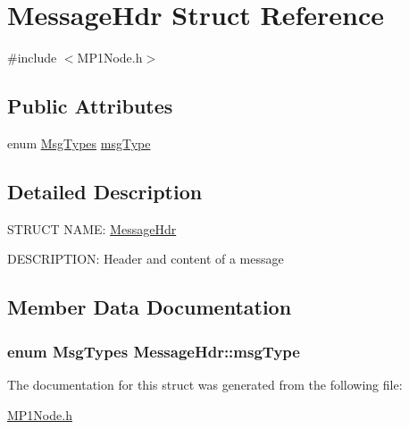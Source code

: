 \hypertarget{struct_message_hdr}{}\section{Message\+Hdr Struct Reference}
\label{struct_message_hdr}


{\ttfamily \#include $<$M\+P1\+Node.\+h$>$}

\subsection*{Public Attributes}
\begin{DoxyCompactItemize}
\item 
enum \hyperlink{_m_p1_node_8h_aac5c14d7f394c4c17a10566926918dc0}{Msg\+Types} \hyperlink{struct_message_hdr_a3eb2c91aac9c66ccbd21eb7c1a3e0fc5}{msg\+Type}
\end{DoxyCompactItemize}


\subsection{Detailed Description}
S\+T\+R\+U\+C\+T N\+A\+M\+E\+: \hyperlink{struct_message_hdr}{Message\+Hdr}

D\+E\+S\+C\+R\+I\+P\+T\+I\+O\+N\+: Header and content of a message 

\subsection{Member Data Documentation}
\hypertarget{struct_message_hdr_a3eb2c91aac9c66ccbd21eb7c1a3e0fc5}{}
\subsubsection[{msg\+Type}]{\setlength{\rightskip}{0pt plus 5cm}enum {\bf Msg\+Types} Message\+Hdr\+::msg\+Type}\label{struct_message_hdr_a3eb2c91aac9c66ccbd21eb7c1a3e0fc5}


The documentation for this struct was generated from the following file\+:\begin{DoxyCompactItemize}
\item 
\hyperlink{_m_p1_node_8h}{M\+P1\+Node.\+h}\end{DoxyCompactItemize}
